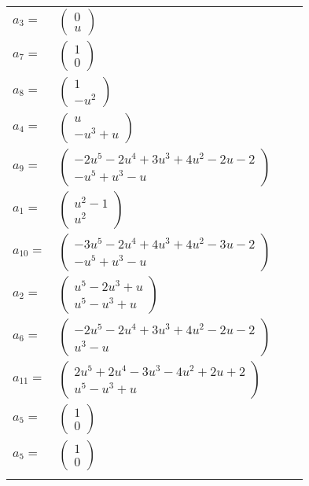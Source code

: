 \documentclass[1p]{elsarticle_modified}
\theoremstyle{definition}
\begin{document}
\begin{tabular}{m{7pt} m{180pt} m{7pt} m{180pt} }
\flushright $a_{3}=$&$\begin{pmatrix}0\\u\end{pmatrix}$ \\
\flushright $a_{7}=$&$\begin{pmatrix}1\\0\end{pmatrix}$ \\
\flushright $a_{8}=$&$\begin{pmatrix}1\\- u^2\end{pmatrix}$ \\
\flushright $a_{4}=$&$\begin{pmatrix}u\\- u^3+u\end{pmatrix}$ \\
\flushright $a_{9}=$&$\begin{pmatrix}-2 u^5-2 u^4+3 u^3+4 u^2-2 u-2\\- u^5+u^3- u\end{pmatrix}$ \\
\flushright $a_{1}=$&$\begin{pmatrix}u^2-1\\u^2\end{pmatrix}$ \\
\flushright $a_{10}=$&$\begin{pmatrix}-3 u^5-2 u^4+4 u^3+4 u^2-3 u-2\\- u^5+u^3- u\end{pmatrix}$ \\
\flushright $a_{2}=$&$\begin{pmatrix}u^5-2 u^3+u\\u^5- u^3+u\end{pmatrix}$ \\
\flushright $a_{6}=$&$\begin{pmatrix}-2 u^5-2 u^4+3 u^3+4 u^2-2 u-2\\u^3- u\end{pmatrix}$ \\
\flushright $a_{11}=$&$\begin{pmatrix}2 u^5+2 u^4-3 u^3-4 u^2+2 u+2\\u^5- u^3+u\end{pmatrix}$ \\
\flushright $a_{5}=$&$\begin{pmatrix}1\\0\end{pmatrix}$\\ \flushright $a_{5}=$&$\begin{pmatrix}1\\0\end{pmatrix}$\\&\end{tabular}
\end{document}
